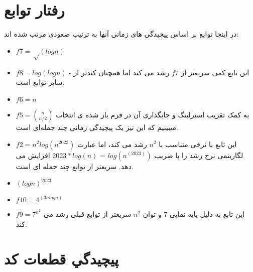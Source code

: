 \documentclass[12pt]{article}
\begin{document}
\fontsize{12pt}{14pt}\selectfont




\section{رفتار توابع}
در اینجا توابع بر اساس پیچیدگی های زمانی آنها به ترتیب صعودی مرتب شده اند:
\begin{itemize}
    \item $f7=√(logn)$
    \item $f8 = log(logn)$ - این تابع کمی سریعتر از $f7$ رشد می کند اما همچنان کندتر از سایر توابع است.
    \item $f6 = n$
    \item $f5 = \binom{n}{n/2}$ به کمک تقریب استرلینگ و جایگذاری آن در فرم باز شده ی انتخاب میبینیم که این نیز یک پیچیدگی زمانی چند جمله‌ای است.
    \item $f2 = n^2 log(n^2023)$ این تابع با نرخی متناسب با $n^2$ رشد می کند، اما عبارت لگاریتمی نرخ رشد را با ضریب $log(n^(2023))$ = $2023*log(n)$ افزایش می دهد. سریعتر از توابع چند جمله ای است.
    \item $(logn)^2023$ 
    \item $f10 = 4^(3nlogn)$ 
    \item $f9 = 7^n^2$ این تابع به دلیل پایه نمایی 7 و توان $n^2$ سریعتر از توابع قبلی رشد می کند.
\end{itemize}



\section{پيچيدگي قطعات كد}
\end{document}
